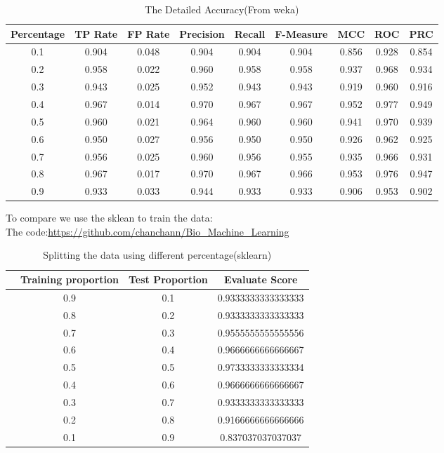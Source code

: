 \documentclass[a4pper,11pt,onecolumn]{article}
\begin{document}
\begin{table}[h] 
	\centering  
	\caption{The Detailed Accuracy(From weka) }  %
	\begin{tabular}{ccccccccc}  
		\hline
		\hline
		Percentage & TP Rate & FP Rate & Precision & Recall & F-Measure & MCC   & ROC   & PRC   \\ [0.5ex] 
		\hline
		0.1        & 0.904   & 0.048   & 0.904     & 0.904  & 0.904     & 0.856 & 0.928 & 0.854 \\
		0.2        & 0.958   & 0.022   & 0.960     & 0.958  & 0.958     & 0.937 & 0.968 & 0.934 \\
		0.3        & 0.943   & 0.025   & 0.952     & 0.943  & 0.943     & 0.919 & 0.960 & 0.916 \\
		0.4        & 0.967   & 0.014   & 0.970     & 0.967  & 0.967     & 0.952 & 0.977 & 0.949 \\
		0.5        & 0.960   & 0.021   & 0.964     & 0.960  & 0.960     & 0.941 & 0.970 & 0.939 \\
		0.6        & 0.950   & 0.027   & 0.956     & 0.950  & 0.950     & 0.926 & 0.962 & 0.925 \\
		0.7        & 0.956   & 0.025   & 0.960     & 0.956  & 0.955     & 0.935 & 0.966 & 0.931 \\
		0.8        & 0.967   & 0.017   & 0.970     & 0.967  & 0.966     & 0.953 & 0.976 & 0.947 \\
		0.9        & 0.933   & 0.033   & 0.944     & 0.933  & 0.933     & 0.906 & 0.953 & 0.902\\
		\hline
		\hline
	\end{tabular}
\end{table}

To compare we use the sklean to train the data:\\

The code:\url{https://github.com/chanchann/Bio_Machine_Learning}\\

\begin{table}[h]  %
	\centering  %
	\caption{Splitting the data using different percentage(sklearn)}  %
	\begin{tabular}{cccc}  %
		\hline
		\hline
		& Training proportion & Test Proportion & Evaluate Score \\ [0.5ex] 
		\hline
		 & 0.9 & 0.1 & 0.9333333333333333  \\
		 & 0.8 & 0.2 & 0.9333333333333333 \\
		 & 0.7 & 0.3 & 0.9555555555555556 \\
		 & 0.6 & 0.4 & 0.9666666666666667 \\
		 & 0.5 & 0.5 & 0.9733333333333334 \\
		 & 0.4 & 0.6 & 0.9666666666666667\\
		 & 0.3 & 0.7 & 0.9333333333333333 \\
		 & 0.2 & 0.8 & 0.9166666666666666 \\
		 & 0.1 & 0.9 & 0.837037037037037 \\
		\hline
		\hline
	\end{tabular}
\end{table}
\end{document}
